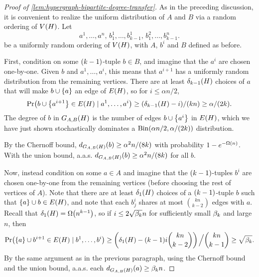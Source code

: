 \documentclass[11pt,english]{article}
\theoremstyle{plain}
\theoremstyle{definition}
\theoremstyle{definition}
\theoremstyle{plain}
\theoremstyle{plain}
\theoremstyle{plain}
\theoremstyle{plain}
\theoremstyle{remark}
\theoremstyle{remark}
\let\originalleft\left
\let\originalright\right
\renewcommand{\left}{\mathopen{}\mathclose\bgroup\originalleft}
\renewcommand{\right}{\aftergroup\egroup\originalright}
\begin{document}
\begin{proof}
[Proof of \ref{lem:hypergraph-bipartite-degree-transfer}]As in the preceding discussion, it is convenient to realize the uniform
distribution of $A$ and $B$ via a random ordering of $V\left(H\right)$.
Let 
\[
a^{1},\dots,a^{n},\, b_{1}^{1},\dots,b_{k-1}^{1},\, b_{1}^{2},\dots,b_{k-1}^{n}.
\]
be a uniformly random ordering of $V\left(H\right)$, with $A$, $b^i$ and
$B$ defined as before.

First, condition on some $\left(k-1\right)$-tuple $b\in B$, and imagine that the $a^i$ are chosen one-by-one. Given $b$ and $a^{1},\dots,a^{i}$, this means that $a^{i+1}$ has a uniformly random distribution from the remaining vertices. There are at least $\delta_{k-1}\left(H\right)$ choices of $a$ that will make $b\cup\left\{a\right\}$ an edge of $E\left(H\right)$, so for $i\le\alpha n/2$,
\[
\Pr\left(b\cup\left\{ a^{i+1}\right\} \in E\left(H\right)\mid a^{1},\dots,a^{i}\right)\ge\left(\delta_{k-1}\left(H\right)-i\right)/\left(kn\right)\ge\alpha/\left(2k\right).
\]
The degree of $b$ in $G_{A,B}\left(H\right)$ is the number of edges $b\cup\left\{ a^{i}\right\}$ in $E\left(H\right)$, which we have just shown stochastically dominates a $\Bin(\alpha n/2,\alpha/\left(2k\right))$ distribution.
\begin{comment}This means we can couple our random ordering with a sequence of independent random variables $X_1,\dots,X_{\alpha n/2}$ each having a Bernoulli distribution with parameter $\alpha/\left(2k\right)$, in such a way that $d_{G_{A,B}\left(H\right)}\left(b\right)\ge\sum_{i=1}^{\alpha n/2}X_i$. \end{comment}
By the Chernoff bound, $d_{G_{A,B}\left(H\right)}\left(b\right)\ge\alpha^{2}n/\left(8k\right)$
with probability $1-e^{-\Omega\left(n\right)}$. With the union bound, a.a.s. $d_{G_{A,B}\left(H\right)}\left(b\right)\ge\alpha^{2}n/\left(8k\right)$ for all $b$.

Now, instead condition on some $a\in A$ and imagine that the $\left(k-1\right)$-tuples $b^i$ are chosen one-by-one from the remaining vertices
(before choosing the rest of vertices of $A$). Note that there are at least $\delta_{1}\left(H\right)$ choices of a $\left(k-1\right)$-tuple $b$ such that $\left\{a\right\}\cup b\in E\left(H\right)$, and note that each $b_{j}^{i}$
shares at most ${kn \choose k-2}$ edges with $a$. Recall that $\delta_1\left(H\right)=\Omega\left(n^{k-1}\right)$, so  if $i\le2\sqrt{\beta_k}n$ for sufficiently small $\beta_k$ and large $n$,
then
\[
\Pr\left(\left\{ a\right\} \cup b^{i+1}\in E\left(H\right)\mid b^{1},\dots,b^{i}\right)\ge\left(\delta_{1}\left(H\right)-\left(k-1\right)i{kn \choose k-2}\right)\left.\vphantom{\sum}\right/{kn \choose k-1}\ge\sqrt{\amat}.
\]
By the same argument as in the previous paragraph, using the Chernoff bound and the union bound, a.a.s. each $d_{G_{A,B}\left(H\right)}\left(a\right)\ge\amat n$.
\end{proof}
\end{document}
